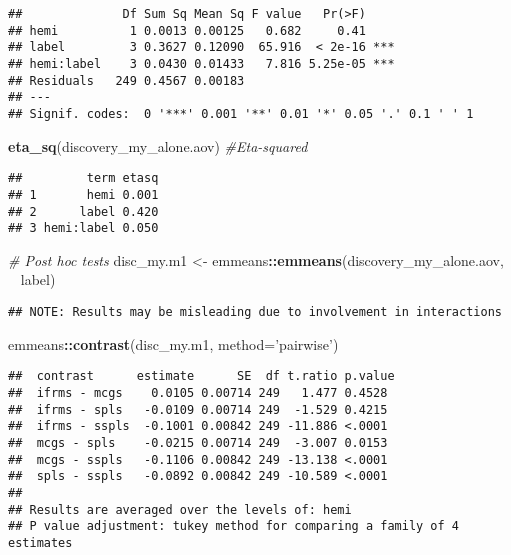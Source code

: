 \documentclass[
]{article}
\newenvironment{Shaded}{\begin{snugshade}}{\end{snugshade}}
\newcommand{\CommentTok}[1]{\textcolor[rgb]{0.56,0.35,0.01}{\textit{#1}}}
\newcommand{\DataTypeTok}[1]{\textcolor[rgb]{0.13,0.29,0.53}{#1}}
\newcommand{\KeywordTok}[1]{\textcolor[rgb]{0.13,0.29,0.53}{\textbf{#1}}}
\newcommand{\NormalTok}[1]{#1}
\newcommand{\OperatorTok}[1]{\textcolor[rgb]{0.81,0.36,0.00}{\textbf{#1}}}
\newcommand{\StringTok}[1]{\textcolor[rgb]{0.31,0.60,0.02}{#1}}
\begin{document}
\begin{verbatim}
##              Df Sum Sq Mean Sq F value   Pr(>F)    
## hemi          1 0.0013 0.00125   0.682     0.41    
## label         3 0.3627 0.12090  65.916  < 2e-16 ***
## hemi:label    3 0.0430 0.01433   7.816 5.25e-05 ***
## Residuals   249 0.4567 0.00183                     
## ---
## Signif. codes:  0 '***' 0.001 '**' 0.01 '*' 0.05 '.' 0.1 ' ' 1
\end{verbatim}

\begin{Shaded}
\begin{Highlighting}[]
\KeywordTok{eta_sq}\NormalTok{(discovery_my_alone.aov) }\CommentTok{#Eta-squared}
\end{Highlighting}
\end{Shaded}

\begin{verbatim}
##         term etasq
## 1       hemi 0.001
## 2      label 0.420
## 3 hemi:label 0.050
\end{verbatim}

\begin{Shaded}
\begin{Highlighting}[]
\CommentTok{# Post hoc tests}
\NormalTok{disc_my.m1 <-}\StringTok{ }\NormalTok{emmeans}\OperatorTok{::}\KeywordTok{emmeans}\NormalTok{(discovery_my_alone.aov, }\OperatorTok{~}\StringTok{ }\NormalTok{label)}
\end{Highlighting}
\end{Shaded}

\begin{verbatim}
## NOTE: Results may be misleading due to involvement in interactions
\end{verbatim}

\begin{Shaded}
\begin{Highlighting}[]
\NormalTok{emmeans}\OperatorTok{::}\KeywordTok{contrast}\NormalTok{(disc_my.m1, }\DataTypeTok{method=}\StringTok{'pairwise'}\NormalTok{)}
\end{Highlighting}
\end{Shaded}

\begin{verbatim}
##  contrast      estimate      SE  df t.ratio p.value
##  ifrms - mcgs    0.0105 0.00714 249   1.477 0.4528 
##  ifrms - spls   -0.0109 0.00714 249  -1.529 0.4215 
##  ifrms - sspls  -0.1001 0.00842 249 -11.886 <.0001 
##  mcgs - spls    -0.0215 0.00714 249  -3.007 0.0153 
##  mcgs - sspls   -0.1106 0.00842 249 -13.138 <.0001 
##  spls - sspls   -0.0892 0.00842 249 -10.589 <.0001 
## 
## Results are averaged over the levels of: hemi 
## P value adjustment: tukey method for comparing a family of 4 estimates
\end{verbatim}
\end{document}
